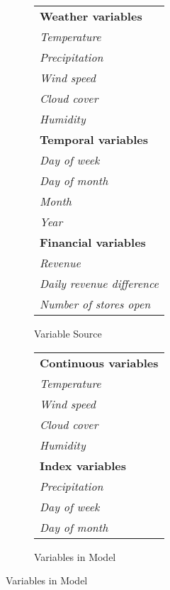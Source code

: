 \begin{figure}[h!]
    \begin{subfigure}{0.5\textwidth}
      \centering
      \caption{Variable Source}
      \label{fig:vars1}
      \begin{tabular}{l}
          \toprule 
          \textbf{Weather variables} \\
          \quad\textit{Temperature} \\
          \quad\textit{Precipitation} \\
          \quad\textit{Wind speed} \\
          \quad\textit{Cloud cover} \\
          \quad\textit{Humidity} \\[0.3em]
          \textbf{Temporal variables} \\
          \quad\textit{Day of week} \\
          \quad\textit{Day of month} \\
          \quad\textit{Month} \\
          \quad\textit{Year} \\[0.3em]
          \textbf{Financial variables} \\
          \quad\textit{Revenue} \\
          \quad\textit{Daily revenue difference} \\
          \quad\textit{Number of stores open} \\[0.3em]
          \bottomrule
      \end{tabular}
    \end{subfigure}%
    \begin{subfigure}{0.5\textwidth}
      \centering
      \caption{Variables in Model}
      \label{fig:vars2}
      \begin{tabular}{l}
          \toprule 
          \textbf{Continuous variables} \\
          \quad\textit{Temperature} \\
          \quad\textit{Wind speed} \\
          \quad\textit{Cloud cover} \\
          \quad\textit{Humidity} \\
          \textbf{Index variables} \\
          \quad\textit{Precipitation} \\
          \quad\textit{Day of week} \\
          \quad\textit{Day of month} \\

\end{tabular}
\end{subfigure}
\end{figure}
